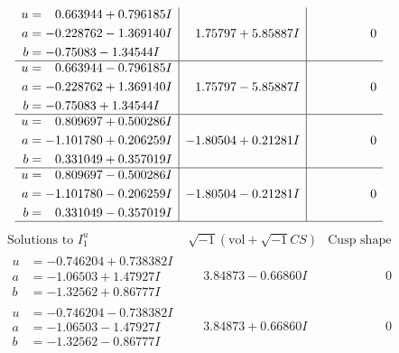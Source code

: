 \documentclass[1p]{elsarticle_modified}
\theoremstyle{definition}
\newcommand{\I}{\sqrt{-1}}
\begin{document}
$$\begin{array}{c|c|c}
\begin{aligned}
u &= \phantom{-}0.663944 + 0.796185 I \\
a &= -0.228762 - 1.369140 I \\
b &= -0.75083 - 1.34544 I\end{aligned}
 & \phantom{-}1.75797 + 5.85887 I & \phantom{-0.000000 } 0 \\ \hline\begin{aligned}
u &= \phantom{-}0.663944 - 0.796185 I \\
a &= -0.228762 + 1.369140 I \\
b &= -0.75083 + 1.34544 I\end{aligned}
 & \phantom{-}1.75797 - 5.85887 I & \phantom{-0.000000 } 0 \\ \hline\begin{aligned}
u &= \phantom{-}0.809697 + 0.500286 I \\
a &= -1.101780 + 0.206259 I \\
b &= \phantom{-}0.331049 + 0.357019 I\end{aligned}
 & -1.80504 + 0.21281 I & \phantom{-0.000000 } 0 \\ \hline\begin{aligned}
u &= \phantom{-}0.809697 - 0.500286 I \\
a &= -1.101780 - 0.206259 I \\
b &= \phantom{-}0.331049 - 0.357019 I\end{aligned}
 & -1.80504 - 0.21281 I & \phantom{-0.000000 } 0\\
 \hline 
 \end{array}$$\newpage$$\begin{array}{c|c|c}  
\text{Solutions to }I^u_{1}& \I (\text{vol} + \sqrt{-1}CS) & \text{Cusp shape}\\
 \hline 
\begin{aligned}
u &= -0.746204 + 0.738382 I \\
a &= -1.06503 + 1.47927 I \\
b &= -1.32562 + 0.86777 I\end{aligned}
 & \phantom{-}3.84873 - 0.66860 I & \phantom{-0.000000 } 0 \\ \hline\begin{aligned}
u &= -0.746204 - 0.738382 I \\
a &= -1.06503 - 1.47927 I \\
b &= -1.32562 - 0.86777 I\end{aligned}
 & \phantom{-}3.84873 + 0.66860 I & \phantom{-0.000000 } 0 \\ \hline\begin{aligned}

\end{aligned}
\end{array}$$
\end{document}
